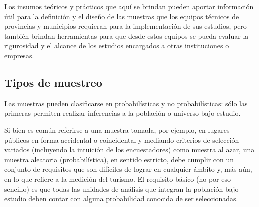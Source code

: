\documentclass[
]{book}
\begin{document}
Los insumos teóricos y prácticos que aquí se brindan pueden aportar información útil para la definición y el diseño de las muestras que los equipos técnicos de provincias y municipios requieran para la implementación de sus estudios, pero también brindan herramientas para que desde estos equipos se pueda evaluar la rigurosidad y el alcance de los estudios encargados a otras instituciones o empresas.

\hypertarget{tipos-de-muestreo}{%
\subsection{Tipos de muestreo}\label{tipos-de-muestreo}}

Las muestras pueden clasificarse en probabilísticas y no probabilísticas: sólo las primeras permiten realizar inferencias a la población o universo bajo estudio.

Si bien es común referirse a una muestra tomada, por ejemplo, en lugares públicos en forma accidental o coincidental y mediando criterios de selección variados (incluyendo la intuición de los encuestadores) como muestra al azar, una muestra aleatoria (probabilística), en sentido estricto, debe cumplir con un conjunto de requisitos que son difíciles de lograr en cualquier ámbito y, más aún, en lo que refiere a la medición del turismo. El requisito básico (no por eso sencillo) es que todas las unidades de análisis que integran la población bajo estudio deben contar con alguna probabilidad conocida de ser seleccionadas.
\end{document}
